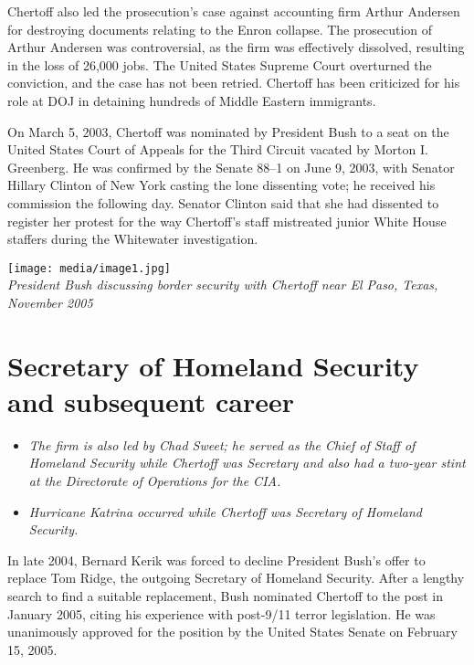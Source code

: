 Chertoff also led the prosecution's case against accounting firm Arthur
Andersen for destroying documents relating to the Enron collapse. The
prosecution of Arthur Andersen was controversial, as the firm was
effectively dissolved, resulting in the loss of 26,000 jobs. The United
States Supreme Court overturned the conviction, and the case has not
been retried. Chertoff has been criticized for his role at DOJ in
detaining hundreds of Middle Eastern immigrants.

On March 5, 2003, Chertoff was nominated by President Bush to a seat on
the United States Court of Appeals for the Third Circuit vacated by
Morton I. Greenberg. He was confirmed by the Senate 88--1 on June 9,
2003, with Senator Hillary Clinton of New York casting the lone
dissenting vote; he received his commission the following day. Senator
Clinton said that she had dissented to register her protest for the way
Chertoff's staff mistreated junior White House staffers during the
Whitewater investigation.

\texttt{[image: media/image1.jpg]}\\
\emph{President Bush discussing border security with Chertoff near El
Paso, Texas, November 2005}

\section{Secretary of Homeland Security and subsequent
career}\label{secretary-of-homeland-security-and-subsequent-career}

\begin{itemize}
\item
  \emph{The firm is also led by Chad Sweet; he served as the Chief of
  Staff of Homeland Security while Chertoff was Secretary and also had a
  two-year stint at the Directorate of Operations for the CIA.}
\item
  \emph{Hurricane Katrina occurred while Chertoff was Secretary of
  Homeland Security.}
\end{itemize}

In late 2004, Bernard Kerik was forced to decline President Bush's offer
to replace Tom Ridge, the outgoing Secretary of Homeland Security. After
a lengthy search to find a suitable replacement, Bush nominated Chertoff
to the post in January 2005, citing his experience with post-9/11 terror
legislation. He was unanimously approved for the position by the United
States Senate on February 15, 2005.

